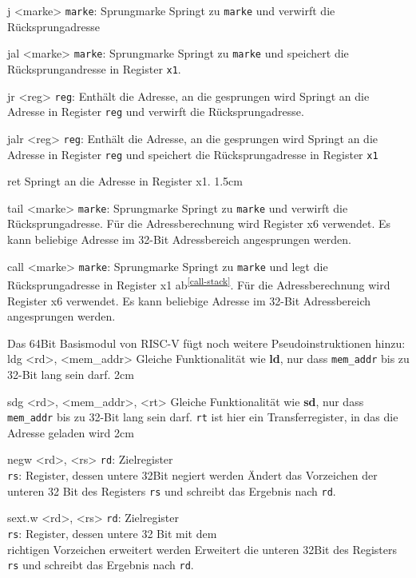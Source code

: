 \pseudoinst
{
  j <marke>
}
{
  \texttt{marke}: Sprungmarke
}
{
  Springt zu \texttt{marke} und verwirft die Rücksprungadresse
}

\pseudoinst
{
  jal <marke>
}
{
  \texttt{marke}: Sprungmarke
}
{
  Springt zu \texttt{marke} und speichert die Rücksprungandresse in Register \texttt{x1}.
}

\pseudoinst
{
  jr <reg>
}
{
  \texttt{reg}: Enthält die Adresse, an die gesprungen wird
}
{
  Springt an die Adresse in Register \texttt{reg} und verwirft die Rücksprungadresse.
}

\pseudoinst
{
  jalr <reg>
}
{
  \texttt{reg}: Enthält die Adresse, an die gesprungen wird
}
{
  Springt an die Adresse in Register \texttt{reg} und speichert die
  Rücksprungadresse in Register \texttt{x1}
}

\pseudoinsttwo
{
  ret
}
{
  Springt an die Adresse in Register x1.\footnotemark
}
{1.5cm}

\pseudoinst
{
  tail <marke>
}
{
  \texttt{marke}: Sprungmarke
}
{
  Springt zu \texttt{marke} und verwirft die Rücksprungadresse. Für die Adressberechnung wird Register x6 verwendet. Es kann beliebige Adresse im 32-Bit Adressbereich angesprungen werden.
}

\pseudoinst
{
  call <marke>
}
{
  \texttt{marke}: Sprungmarke
}
{
  Springt zu \texttt{marke} und legt die Rücksprungadresse in Register x1 ab\textsuperscript{\ref{call-stack}}.  Für die Adressberechnung wird Register x6 verwendet. Es kann beliebige Adresse im 32-Bit Adressbereich angesprungen werden.
}


\pagebreak
Das 64Bit Basismodul von RISC-V fügt noch weitere Pseudoinstruktionen hinzu:\\

\pseudoinsttwo
{
  ldg <rd>, <mem\_addr>
}
{
  Gleiche Funktionalität wie \textbf{ld}, nur dass \texttt{mem\_addr} bis zu 32-Bit lang sein darf.
}
{2cm}

\pseudoinsttwo
{
  sdg <rd>, <mem\_addr>, <rt>
}
{
  Gleiche Funktionalität wie \textbf{sd}, nur dass \texttt{mem\_addr} bis zu 32-Bit lang sein darf. \texttt{rt} ist hier ein Transferregister, in das die Adresse geladen wird
}
{2cm}

\pseudoinst
{
  negw <rd>, <rs>
}
{
  \texttt{rd}: Zielregister \\
  \texttt{rs}: Register, dessen untere 32Bit negiert werden
}
{
  Ändert das Vorzeichen der unteren 32 Bit des Registers \texttt{rs} und schreibt das Ergebnis nach \texttt{rd}.
}

\pseudoinst
{
  sext.w <rd>, <rs>
}
{
  \texttt{rd}: Zielregister \\
  \texttt{rs}: Register, dessen untere 32 Bit mit dem\\ richtigen Vorzeichen erweitert werden
}
{
  Erweitert die unteren 32Bit des Registers \texttt{rs} und schreibt das Ergebnis nach \texttt{rd}.
}
